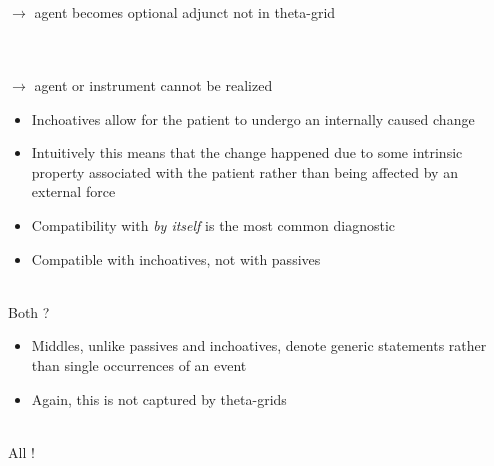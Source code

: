 \documentclass[headrule,footrule]{foils}
\begin{document}
\begin{exe}
\ex \begin{xlist}
  \ex {}\\
\ex {}\\
    $\rightarrow$ agent becomes optional adjunct not in theta-grid
\end{xlist}

\ex \begin{xlist}
  \ex {}\\
\ex {}\\
    $\rightarrow$ agent or instrument cannot be realized
\end{xlist}

\end{exe}


\begin{itemize}

\item Inchoatives allow for the patient to undergo an internally caused change
\item Intuitively this means that the change happened due to some intrinsic property associated with the patient rather than being affected by an external force

\end{itemize}


\begin{itemize}
\item Compatibility with \emph{by itself} is the most common diagnostic
\item Compatible with inchoatives, not with passives
\end{itemize}
\begin{exe}
  \ex \begin{xlist}
    \ex {}
    \ex {}
    \\Both {}?
  \end{xlist}
\end{exe}


\begin{itemize}
\item Middles, unlike passives and inchoatives, denote generic statements rather than single occurrences of an event
\item Again, this is not captured by theta-grids
\end{itemize}
\begin{exe}
  \ex \begin{xlist}
    \ex {}
    \ex {}
    \ex {}
    \\All {}!
  \end{xlist}
\end{exe}
\end{document}
